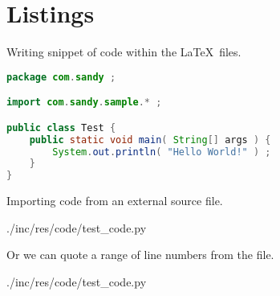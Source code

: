\newpage
\section{Listings}

Writing snippet of code within the \LaTeX\ files.

\vspace{5mm}
\begin{lstlisting}[language=Java, caption={Inline code}]
package com.sandy ;

import com.sandy.sample.* ;

public class Test {
    public static void main( String[] args ) {
        System.out.println( "Hello World!" ) ;
    }
}
\end{lstlisting}

Importing code from an external source file.

\vspace{5mm}

    {./inc/res/code/test_code.py}

Or we can quote a range of line numbers from the file.

\vspace{5mm}

    {./inc/res/code/test_code.py}
\vspace{5mm}
